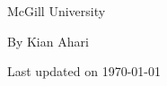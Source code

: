 \begin{titlepage}
	\begin{titlepage}
		\begin{flushright}
			\LARGE
			
			\vspace{0.5cm}
			\large
			McGill University
			\vspace{0.5 cm}

			By Kian Ahari
			\vspace{0.5 cm}
			
			Last updated on \today
			\vfill
		\end{flushright}
	\end{titlepage}
\end{titlepage}
\newpage
\thispagestyle{empty}
\tableofcontents
\newpage


